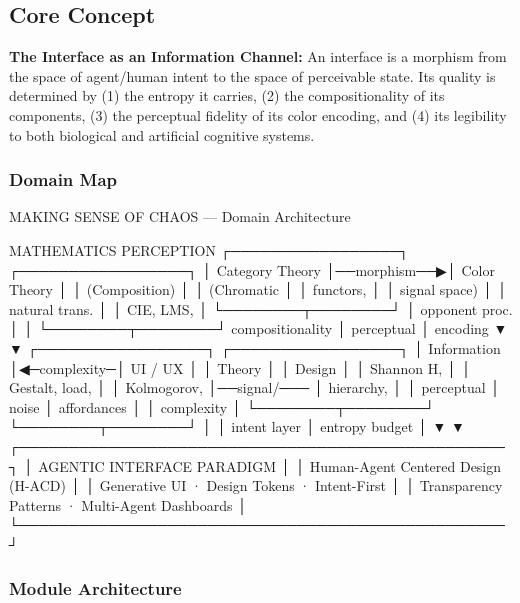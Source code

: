\documentclass[11pt,letterpaper]{article}
\begin{document}
\subsection{Core Concept}

\textbf{The Interface as an Information Channel:} An interface is a morphism from the space of agent/human intent to the space of perceivable state. Its quality is determined by (1) the entropy it carries, (2) the compositionality of its components, (3) the perceptual fidelity of its color encoding, and (4) its legibility to both biological and artificial cognitive systems.

\subsubsection{Domain Map}

\begin{asciibox}
MAKING SENSE OF CHAOS — Domain Architecture

  MATHEMATICS                      PERCEPTION
  ┌─────────────────┐              ┌─────────────────┐
  │ Category Theory │──morphism──▶│  Color Theory   │
  │  (Composition)  │              │  (Chromatic     │
  │  functors,      │              │   signal space) │
  │  natural trans. │              │  CIE, LMS,      │
  └────────┬────────┘              │  opponent proc. │
           │                       └────────┬────────┘
     compositionality                       │ perceptual
           │                           encoding
           ▼                                ▼
  ┌─────────────────┐              ┌─────────────────┐
  │  Information    │◀─complexity─│   UI / UX       │
  │    Theory       │              │   Design        │
  │  Shannon H,     │              │  Gestalt, load, │
  │  Kolmogorov,    │──signal/─── │  hierarchy,     │
  │  perceptual     │  noise       │  affordances    │
  │  complexity     │              └────────┬────────┘
  └────────┬────────┘                       │
           │                          intent layer
           │ entropy budget                 │
           ▼                                ▼
  ┌─────────────────────────────────────────────────┐
  │         AGENTIC INTERFACE PARADIGM              │
  │  Human-Agent Centered Design (H-ACD)            │
  │  Generative UI · Design Tokens · Intent-First   │
  │  Transparency Patterns · Multi-Agent Dashboards │
  └─────────────────────────────────────────────────┘
\end{asciibox}

\subsubsection{Module Architecture}
\end{document}
